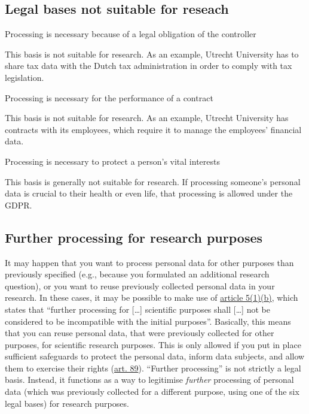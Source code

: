\documentclass[
]{book}
\begin{document}
\hypertarget{legal-bases-not-suitable-for-reseach}{%
\subsection{Legal bases not suitable for reseach}\label{legal-bases-not-suitable-for-reseach}}

Processing is necessary because of a legal obligation of the controller

This basis is not suitable for research. As an example, Utrecht
University has to share tax data with the Dutch tax administration in
order to comply with tax legislation.

Processing is necessary for the performance of a contract

This basis is not suitable for research. As an example, Utrecht
University has contracts with its employees, which require it to manage
the employees' financial data.

Processing is necessary to protect a person's vital interests

This basis is generally not suitable for research. If processing
someone's personal data is crucial to their health or even life, that
processing is allowed under the GDPR.

\hypertarget{further-processing}{%
\subsection{Further processing for research purposes}\label{further-processing}}

It may happen that you want to process personal data for other purposes than
previously specified (e.g., because you formulated an additional research
question), or you want to reuse previously collected personal data in your
research. In these cases, it may be possible to make use of
\href{https://gdpr-info.eu/art-5-gdpr/}{article 5(1)(b)},
which states that ``further processing for {[}\ldots{]} scientific purposes shall {[}\ldots{]}
not be considered to be incompatible with the initial purposes''. Basically, this
means that you can reuse personal data, that were previously collected for other
purposes, for scientific research purposes. This is only allowed if you put in
place sufficient safeguards to protect the personal data, inform data subjects,
and allow them to exercise their rights
(\href{https://gdpr-info.eu/art-89-gdpr/}{art. 89}).
``Further processing'' is not strictly a legal basis. Instead, it functions as a
way to legitimise \emph{further} processing of personal data (which was previously
collected for a different purpose, using one of the six legal bases) for research
purposes.
\end{document}
